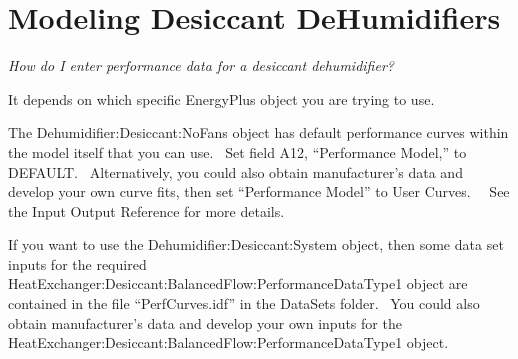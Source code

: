 \section{Modeling Desiccant DeHumidifiers}\label{modeling-desiccant-dehumidifiers}

\emph{How do I enter performance data for a desiccant dehumidifier?}

It depends on which specific EnergyPlus object you are trying to use.

The Dehumidifier:Desiccant:NoFans object has default performance curves within the model itself that you can use.~ Set field A12, ``Performance Model,'' to DEFAULT.~ Alternatively, you could also obtain manufacturer's data and develop your own curve fits, then set ``Performance Model'' to User Curves.~~ See the Input Output Reference for more details.

If you want to use the Dehumidifier:Desiccant:System object, then some data set inputs for the required HeatExchanger:Desiccant:BalancedFlow:PerformanceDataType1 object are contained in the file ``PerfCurves.idf'' in the DataSets folder.~ You could also obtain manufacturer's data and develop your own inputs for the HeatExchanger:Desiccant:BalancedFlow:PerformanceDataType1 object.
